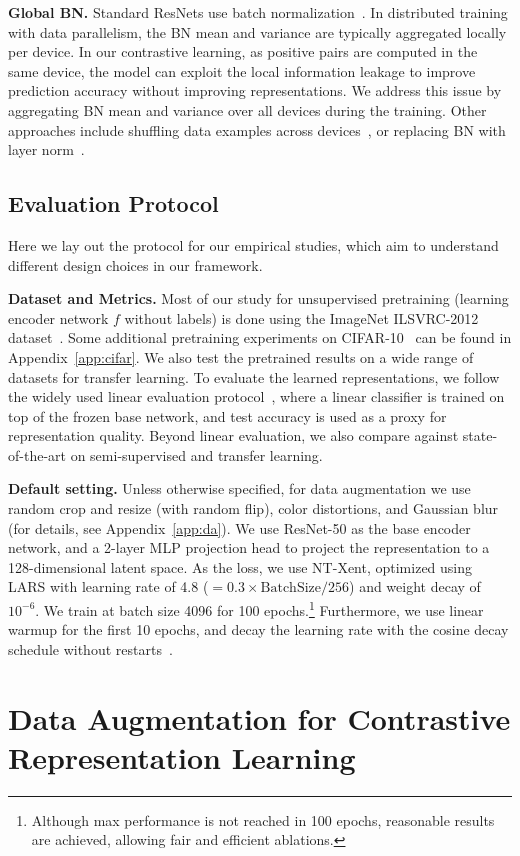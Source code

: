 \textbf{Global BN.} Standard ResNets use batch normalization~\cite{ioffe2015batch}. In distributed training with data parallelism, the BN mean and variance are typically aggregated locally per device. In our contrastive learning, as positive pairs are computed in the same device, the model can exploit the local information leakage to improve prediction accuracy without improving representations. We address this issue by aggregating BN mean and variance over all devices during the training. Other approaches include shuffling data examples across devices~\cite{he2019momentum}, or replacing BN with layer norm~\cite{henaff2019data}.

\subsection{Evaluation Protocol} Here we lay out the protocol for our empirical studies, which aim to understand different design choices in our framework.

\textbf{Dataset and Metrics.} Most of our study for unsupervised pretraining (learning encoder network $f$ without labels) is done using the ImageNet ILSVRC-2012 dataset~\cite{russakovsky2015imagenet}. Some additional pretraining experiments on CIFAR-10~\cite{krizhevsky2009learning} can be found in Appendix~\ref{app:cifar}. We also test the pretrained results on a wide range of datasets for transfer learning. To evaluate the learned representations, we follow the widely used linear evaluation protocol~\cite{zhang2016colorful,oord2018representation,bachman2019learning,kolesnikov2019revisiting}, where a linear classifier is trained on top of the frozen base network, and test accuracy is used as a proxy for representation quality. Beyond linear evaluation, we also compare against state-of-the-art on semi-supervised and transfer learning.

\textbf{Default setting.} Unless otherwise specified, for data augmentation we use random crop and resize (with random flip), color distortions, and Gaussian blur (for details, see Appendix~\ref{app:da}). We use ResNet-50 as the base encoder network, and a 2-layer MLP projection head to project the representation to a 128-dimensional latent space. As the loss, we use NT-Xent, optimized using LARS with learning rate of 4.8 ($=0.3\times\mathrm{BatchSize}/256$) and weight decay of $10^{-6}$. We train at batch size 4096 for 100 epochs.\footnote{Although max performance is not reached in 100 epochs, reasonable results are achieved, allowing fair and efficient ablations.} Furthermore, we use linear warmup for the first 10 epochs, and decay the learning rate with the cosine decay schedule without restarts~\cite{loshchilov2016sgdr}. \section{Data Augmentation for Contrastive Representation Learning}
\label{sec:da}


